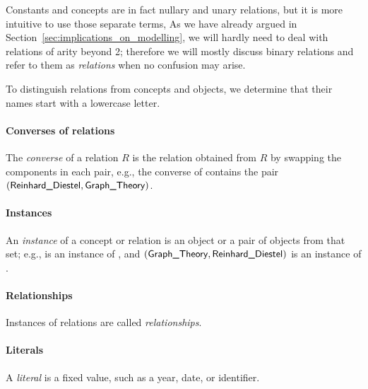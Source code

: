 Constants and concepts are in fact nullary and unary relations,
but it is more intuitive to use those separate terms,
As we have already argued in Section~\ref{sec:implications_on_modelling},
we will hardly need to deal with relations of arity beyond 2;
therefore we will mostly discuss binary relations
and refer to them as \emph{relations} when no confusion may arise.

To distinguish relations from concepts and objects,
we determine that their names start with a lowercase letter.

\paragraph{Converses of relations}
The \emph{converse} of a relation $R$ is the relation obtained from $R$
by swapping the components in each pair,
e.g., the converse  of 
contains the pair $(\textsf{Reinhard\_Diestel},\textsf{Graph\_Theory})$.

\paragraph{Instances}
An \emph{instance} of a concept or relation
is an object or a pair of objects from that set;
e.g.,  is an instance of ,
and $(\textsf{Graph\_Theory},\textsf{Reinhard\_Diestel})$ is an instance of
.

\paragraph{Relationships}
Instances of relations are called \emph{relationships}.

\paragraph{Literals}
A \emph{literal} is a fixed value, such as a year, date, or identifier.

